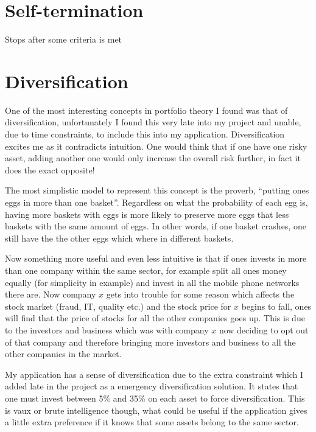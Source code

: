 \documentclass{pdfmx4020}
\begin{document}
  \section{Self-termination} %
  \label{sec:self_termination}
    Stops after some criteria is met

  \section{Diversification} %
  \label{sec:diversification}
    One of the most interesting concepts in portfolio theory I found was that of diversification, unfortunately I found this very late into my project and unable, due to time constraints, to include this into my application. Diversification excites me as it contradicts intuition. One would think that if one have one risky asset, adding another one would only increase the overall risk further, in fact it does the exact opposite!

    The most simplistic model to represent this concept is the proverb, ``putting ones eggs in more than one basket''. Regardless on what the probability of each egg is, having more baskets with eggs is more likely to preserve more eggs that less baskets with the same amount of eggs. In other words, if one basket crashes, one still have the the other eggs which where in different baskets. 

    Now something more useful and even less intuitive is that if ones invests in more than one company within the same sector, for example split all ones money equally (for simplicity in example) and invest in all the mobile phone networks there are. Now company $x$ gets into trouble for some reason which affects the stock market (fraud, IT, quality etc.) and the stock price for $x$ begins to fall, ones will find that the price of stocks for all the other companies goes up. This is due to the investors and business which was with company $x$ now deciding to opt out of that company and therefore bringing more investors and business to all the other companies in the market. 

    My application has a sense of diversification due to the extra constraint which I added late in the project as a emergency diversification solution. It states that one must invest between 5\% and 35\% on each asset to force diversification. This is vaux or brute intelligence though, what could be useful if the application gives a little extra preference if it knows that some assets belong to the same sector. 
\end{document}
